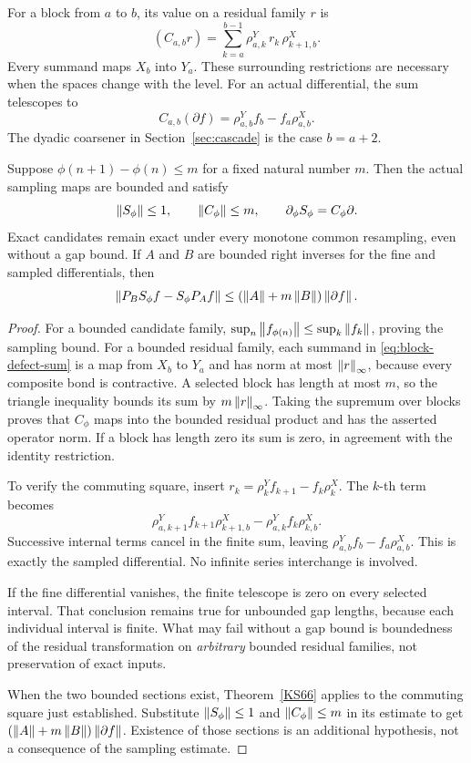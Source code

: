 For a block from \(a\) to \(b\), its value on a residual family \(r\) is
\begin{equation}\label{eq:block-defect-sum}
 (C_{a,b}r)=\sum_{k=a}^{b-1}
 \rho^Y_{a,k}\,r_k\,\rho^X_{k+1,b}.
\end{equation}
Every summand maps \(X_b\) into \(Y_a\). These surrounding restrictions are necessary when the spaces change with the level. For an actual differential, the sum telescopes to
\[
 C_{a,b}(\partial f)=\rho^Y_{a,b}f_b-f_a\rho^X_{a,b}.
\]
The dyadic coarsener in Section~\ref{sec:cascade} is the case \(b=a+2\).

\begin{theorem}\label{KS67}
Suppose \(\phi(n+1)-\phi(n)\le m\) for a fixed natural number \(m\). Then the actual sampling maps are bounded and satisfy
\[
 \left\lVert S_\phi\right\rVert\le1,\qquad \left\lVert C_\phi\right\rVert\le m,
 \qquad \partial_\phi S_\phi=C_\phi\partial.
\]
Exact candidates remain exact under every monotone common resampling, even without a gap bound. If \(A\) and \(B\) are bounded right inverses for the fine and sampled differentials, then
\[
 \left\lVert P_BS_\phi f-S_\phi P_Af\right\rVert
 \le(\left\lVert A\right\rVert+m\left\lVert B\right\rVert)\left\lVert\partial f\right\rVert.
\]
\end{theorem}
\begin{proof}
For a bounded candidate family, \(\sup_n\left\lVert f_{\phi(n)}\right\rVert\le\sup_k\left\lVert f_k\right\rVert\), proving the sampling bound. For a bounded residual family, each summand in \eqref{eq:block-defect-sum} is a map from \(X_b\) to \(Y_a\) and has norm at most \(\left\lVert r\right\rVert_\infty\), because every composite bond is contractive. A selected block has length at most \(m\), so the triangle inequality bounds its sum by \(m\left\lVert r\right\rVert_\infty\). Taking the supremum over blocks proves that \(C_\phi\) maps into the bounded residual product and has the asserted operator norm. If a block has length zero its sum is zero, in agreement with the identity restriction.

To verify the commuting square, insert
\(r_k=\rho^Y_kf_{k+1}-f_k\rho^X_k\). The \(k\)-th term becomes
\[
 \rho^Y_{a,k+1}f_{k+1}\rho^X_{k+1,b}
 -\rho^Y_{a,k}f_k\rho^X_{k,b}.
\]
Successive internal terms cancel in the finite sum, leaving \(\rho^Y_{a,b}f_b-f_a\rho^X_{a,b}\). This is exactly the sampled differential. No infinite series interchange is involved.

If the fine differential vanishes, the finite telescope is zero on every selected interval. That conclusion remains true for unbounded gap lengths, because each individual interval is finite. What may fail without a gap bound is boundedness of the residual transformation on \emph{arbitrary} bounded residual families, not preservation of exact inputs.

When the two bounded sections exist, Theorem~\ref{KS66} applies to the commuting square just established. Substitute \(\left\lVert S_\phi\right\rVert\le1\) and \(\left\lVert C_\phi\right\rVert\le m\) in its estimate to get \((\left\lVert A\right\rVert+m\left\lVert B\right\rVert)\left\lVert\partial f\right\rVert\). Existence of those sections is an additional hypothesis, not a consequence of the sampling estimate.
\end{proof}
